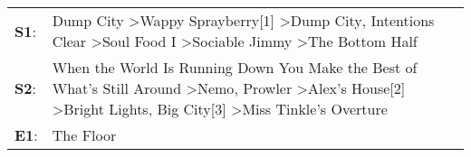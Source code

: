 \begin{supertabular}{p{0.03\textwidth}p{0.92\textwidth}}
 \textbf{S1}:  &             Dump City\textsuperscript{} \textgreater \enspace Wappy Sprayberry[1]\textsuperscript{} \textgreater \enspace Dump City\textsuperscript{}, \enspace Intentions Clear\textsuperscript{} \textgreater \enspace Soul Food I\textsuperscript{} \textgreater \enspace Sociable Jimmy\textsuperscript{} \textgreater \enspace The Bottom Half\textsuperscript{}  \enspace  \\
 \textbf{S2}:  &  When the World Is Running Down You Make the Best of What's Still Around\textsuperscript{} \textgreater \enspace Nemo\textsuperscript{}, \enspace Prowler\textsuperscript{} \textgreater \enspace Alex's House[2]\textsuperscript{} \textgreater \enspace Bright Lights, Big City[3]\textsuperscript{} \textgreater \enspace Miss Tinkle's Overture\textsuperscript{}  \enspace  \\
 \textbf{E1}:  &                                                                                                                                                                                                                                                                                                                                           The Floor\textsuperscript{}  \enspace  \\
\end{supertabular}
